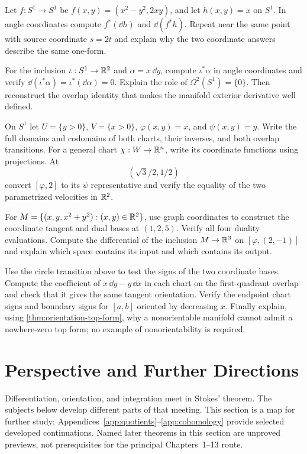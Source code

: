 \begin{exercise}
Let $f:S^1\to S^1$ be $f(x,y)=(x^2-y^2,2xy)$, and let $h(x,y)=x$
on $S^1$. In angle coordinates compute $f^*(\dd h)$ and $\dd(f^*h)$.
Repeat near the same point with source coordinate $s=2t$ and explain why
the two coordinate answers describe the same one-form.
\end{exercise}
\begin{exercise}
For the inclusion $\iota:S^1\to\mathbb{R}^2$ and $\alpha=x\,\dd y$, compute
$\iota^*\alpha$ in angle coordinates and verify
$\dd(\iota^*\alpha)=\iota^*(\dd\alpha)=0$.
Explain the role of $\Omega^2(S^1)=\{0\}$. Then reconstruct the overlap
identity that makes the manifold exterior derivative well defined.
\end{exercise}

\begin{exercise}
On $S^1$ let $U=\{y>0\}$, $V=\{x>0\}$, $\varphi(x,y)=x$, and
$\psi(x,y)=y$. Write the full domains and codomains of both charts,
their inverses, and both overlap transitions. For a general chart
$\chi:W\to\mathbb{R}^n$, write its coordinate functions using projections.
At
\[
(\sqrt3/2,1/2)
\]
 convert $[\varphi,2]$ to its $\psi$ representative
and verify the equality of the two parametrized velocities in $\mathbb{R}^2$.
\end{exercise}
\begin{exercise}
For $M=\{(x,y,x^2+y^2):(x,y)\in\mathbb{R}^2\}$, use graph coordinates to
construct the coordinate tangent and dual bases at $(1,2,5)$.
Verify all four duality evaluations. Compute the differential of the
inclusion $M\to\mathbb{R}^3$ on $[\varphi,(2,-1)]$ and explain which space
contains its input and which contains its output.
\end{exercise}
\begin{exercise}
Use the circle transition above to test the signs of the two coordinate
bases. Compute the coefficient of $x\,\dd y-y\,\dd x$ in each chart
on the first-quadrant overlap and check that it gives the same tangent
orientation. Verify the endpoint chart signs and boundary signs for
$[a,b]$ oriented by decreasing $x$. Finally explain, using
\cref{thm:orientation-top-form}, why a nonorientable manifold cannot
admit a nowhere-zero top form; no example of nonorientability is required.
\end{exercise}

\section{Perspective and Further Directions}
\label{sec:perspective-further-directions}
Differentiation, orientation, and integration meet in Stokes' theorem.
The subjects below develop different parts of that meeting. This section
is a map for further study;
Appendices~\ref{app:quotients}--\ref{app:cohomology} provide selected developed
continuations. Named later theorems in this section are unproved previews,
not prerequisites for the principal Chapters~1--13 route.

